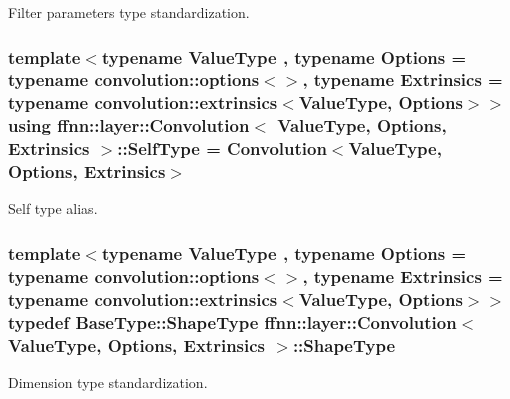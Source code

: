 Filter parameters type standardization. 

\hypertarget{classffnn_1_1layer_1_1_convolution_ac3985357df433360d75f39353faae600}{
\subsubsection[{Self\-Type}]{\setlength{\rightskip}{0pt plus 5cm}template$<$typename Value\-Type , typename Options  = typename convolution\-::options$<$$>$, typename Extrinsics  = typename convolution\-::extrinsics$<$\-Value\-Type, Options$>$$>$ using {\bf ffnn\-::layer\-::\-Convolution}$<$ Value\-Type, Options, Extrinsics $>$\-::{\bf Self\-Type} =  {\bf Convolution}$<$Value\-Type, Options, Extrinsics$>$}}\label{classffnn_1_1layer_1_1_convolution_ac3985357df433360d75f39353faae600}


Self type alias. 

\hypertarget{classffnn_1_1layer_1_1_convolution_ab76070ee3cc7b42325f46bc3bc86bf5f}{
\subsubsection[{Shape\-Type}]{\setlength{\rightskip}{0pt plus 5cm}template$<$typename Value\-Type , typename Options  = typename convolution\-::options$<$$>$, typename Extrinsics  = typename convolution\-::extrinsics$<$\-Value\-Type, Options$>$$>$ typedef Base\-Type\-::\-Shape\-Type {\bf ffnn\-::layer\-::\-Convolution}$<$ Value\-Type, Options, Extrinsics $>$\-::{\bf Shape\-Type}}}\label{classffnn_1_1layer_1_1_convolution_ab76070ee3cc7b42325f46bc3bc86bf5f}


Dimension type standardization. 



